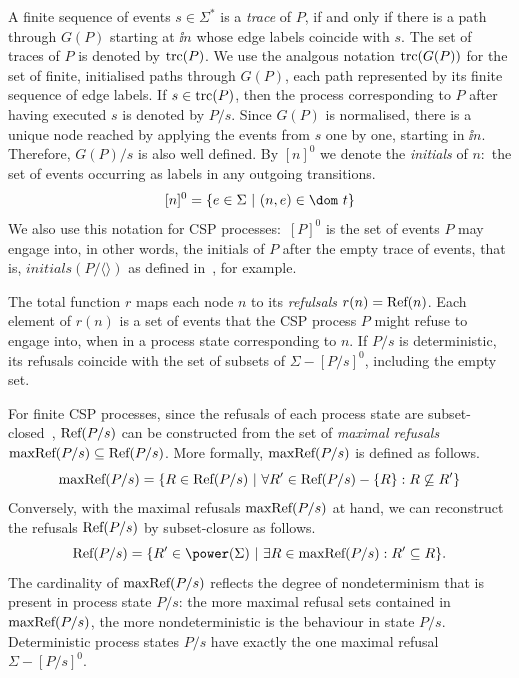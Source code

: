 A finite sequence of events $s\in\Sigma^*$ is a \emph{trace} of $P$, if and only if 
there
is a path through $G(P)$ starting  at $\ii n$ whose edge labels coincide with
$s$. The set of traces of $P$ is denoted by $\text{trc}(P)$. We use the analgous notation
$\text{trc}(G(P))$ for the set of finite, initialised paths through $G(P)$, each path represented by its finite sequence of edge labels.
If $s\in\text{trc}(P)$, then
the process corresponding to $P$ after having executed $s$ is denoted by
$P/s$. Since $G(P)$ is normalised, there is a unique node reached by applying
the events from $s$ one by one, starting in $\ii n$. Therefore, $G(P)/s$  is
also well defined. By $[n]^0$ we denote the \emph{initials} of $n$:~the set
of events occurring as labels in any outgoing transitions.
$$
[n]^0 = \{ e\in\Sigma~|~(n,e)\in\dom~t \}
$$
We also use this notation for CSP processes:~$[P]^0$ is the set of events $P$
may engage into, in other words, the initials of $P$ after the empty trace of
events, that is, $initials(P/\langle\rangle)$ as defined
in~\cite{Roscoe2010}, for example.

The total function $r$ maps each node $n$ to its \emph{refulsals} $r(n) =
\text{Ref}(n)$. Each element of $r(n)$ is a set of events that the CSP process $P$
might refuse to engage into, when in a process state corresponding to $n$.
 If $P/s$ is deterministic, its refusals coincide with the set of
subsets of $\Sigma - [P/s]^0$, including the empty set.

For finite CSP processes, since the refusals of each process state are
subset-closed~\cite{Hoare:1985:CSP:3921,Roscoe2010}, $\text{Ref}(P/s)$ can be
constructed from the set of \emph{maximal refusals}
$\text{maxRef}(P/s)\subseteq\text{Ref}(P/s)$. More formally, $\text{maxRef}(P/s)$ is defined
as follows.
%
\begin{equation}
\text{maxRef}(P/s) = \{ R \in\text{Ref}(P/s)~|~\forall R'\in \text{Ref}(P/s) - \{ R\}: R \not\subseteq R'\}
\end{equation}
%
Conversely, with the maximal refusals $\text{maxRef}(P/s)$ at hand, we can
reconstruct the refusals $\text{Ref}(P/s)$ by subset-closure as follows.
%
\begin{equation}
\refs(P/s) = \{ R'\in\power(\Sigma)~|~\exists R\in \maxrefs(P/s): R'\subseteq R \}.
\end{equation}
%
The cardinality of $\text{maxRef}(P/s)$ reflects the degree of
nondeterminism that is present in process state $P/s$: the more maximal refusal sets
contained in  $\text{maxRef}(P/s)$, the more nondeterministic is the behaviour in
state $P/s$. Deterministic process states $P/s$ have exactly the one maximal refusal
$\Sigma-[P/s]^0$.

